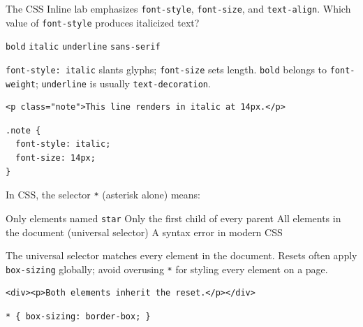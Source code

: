 \question[4]
The CSS Inline lab emphasizes \texttt{font-style}, \texttt{font-size}, and \texttt{text-align}. Which value of \texttt{font-style} produces italicized text?
\begin{choices}
  \choice \texttt{bold}
  \CorrectChoice \texttt{italic}
  \choice \texttt{underline}
  \choice \texttt{sans-serif}
\end{choices}
\begin{solution}
  \texttt{font-style: italic} slants glyphs; \texttt{font-size} sets length. \texttt{bold} belongs to \texttt{font-weight}; \texttt{underline} is usually \texttt{text-decoration}.
\begin{lstlisting}[style=htmlinline]
<p class="note">This line renders in italic at 14px.</p>
\end{lstlisting}
\begin{lstlisting}[style=cssinline]
.note {
  font-style: italic;
  font-size: 14px;
}
\end{lstlisting}
\end{solution}

\question[4]
In CSS, the selector \texttt{*} (asterisk alone) means:
\begin{choices}
  \choice Only elements named \texttt{star}
  \choice Only the first child of every parent
  \CorrectChoice All elements in the document (universal selector)
  \choice A syntax error in modern CSS
\end{choices}
\begin{solution}
  The universal selector matches every element in the document. Resets often apply \texttt{box-sizing} globally; avoid overusing \texttt{*} for styling every element on a page.
\begin{lstlisting}[style=htmlinline]
<div><p>Both elements inherit the reset.</p></div>
\end{lstlisting}
\begin{lstlisting}[style=cssinline]
* { box-sizing: border-box; }
\end{lstlisting}
\end{solution}

